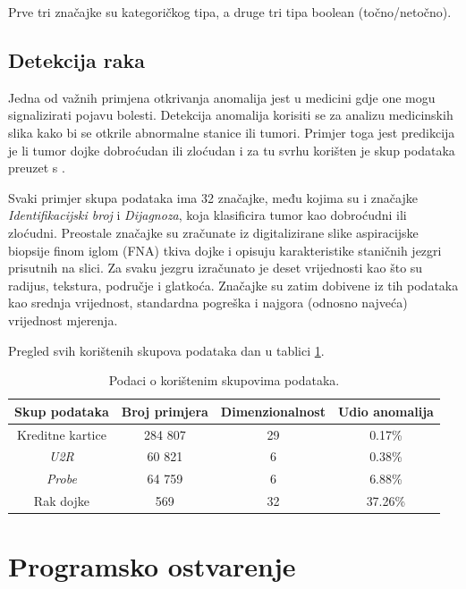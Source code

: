 \documentclass[utf8, diplomski, numeric]{fer}
\begin{document}
Prve tri značajke su kategoričkog tipa, a druge tri tipa boolean (točno/netočno).

\section{Detekcija raka}
Jedna od važnih primjena otkrivanja anomalija jest u medicini gdje one mogu signalizirati pojavu bolesti. Detekcija anomalija korisiti se za analizu medicinskih slika kako bi se otkrile abnormalne stanice ili tumori. Primjer toga jest predikcija je li tumor dojke dobroćudan ili zloćudan i za tu svrhu korišten je skup podataka preuzet s \cite{Dua:2019}.

Svaki primjer skupa podataka ima 32 značajke, među kojima su i značajke \textit{Identifikacijski broj} i \textit{Dijagnoza}, koja klasificira tumor kao dobroćudni ili zloćudni. Preostale značajke su zračunate iz digitalizirane slike aspiracijske biopsije finom iglom (FNA) tkiva dojke i opisuju karakteristike staničnih jezgri prisutnih na slici. Za svaku jezgru izračunato je deset vrijednosti kao što su radijus, tekstura, područje i glatkoća. Značajke su zatim dobivene iz tih podataka kao srednja vrijednost, standardna pogreška i najgora (odnosno najveća) vrijednost mjerenja. 

Pregled svih korištenih skupova podataka dan u tablici \ref{tab:datasets}.

\begin{table}[h!]
  \begin{center}
    \caption{Podaci o korištenim skupovima podataka.}
    \label{tab:datasets}
    \begin{tabular}{c|c|c|c} 
      \textbf{Skup podataka} & \textbf{Broj primjera} & \textbf{Dimenzionalnost}  & \textbf{Udio anomalija}\\
      \hline
      Kreditne kartice & 284 807 & 29 & 0.17\% \\
      \textit{U2R} & 60 821 & 6 & 0.38\% \\
      \textit{Probe} & 64 759 & 6 & 6.88\% \\
      Rak dojke & 569& 32 & 37.26\% \\
     \end{tabular}
  \end{center}
\end{table}


\chapter{Programsko ostvarenje}
\end{document}
